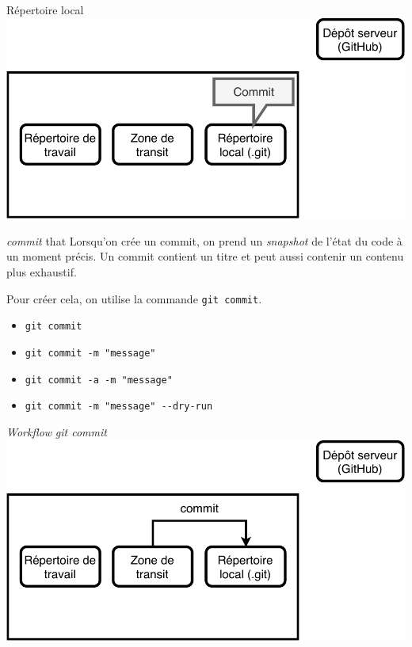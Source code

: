 \documentclass[11pt]{beamer}
\begin{document}
\begin{frame}{Répertoire local}
	\includegraphics[width=0.95\linewidth,height=0.95\textheight,keepaspectratio]{commited.pdf}
\end{frame}

\begin{frame}[fragile]{\textit{commit} that}
	Lorsqu'on crée un commit, on prend un \textit{snapshot} de l'état du code à un moment précis. Un commit  contient un titre et peut aussi contenir un contenu plus exhaustif.
	\bigskip
	
	Pour créer cela, on utilise la commande \verb|git commit|.
	
	\begin{itemize}[<+->]
		\item \verb|git commit|
		\item \verb|git commit -m "message"|
		\item \verb|git commit -a -m "message"|
		\item \verb|git commit -m "message" --dry-run|
	\end{itemize}
\end{frame}
\begin{frame}{\textit{Workflow} \textit{git commit}}
	\includegraphics[width=0.95\linewidth,height=0.95\textheight,keepaspectratio]{commit.pdf}
\end{frame}
\end{document}
